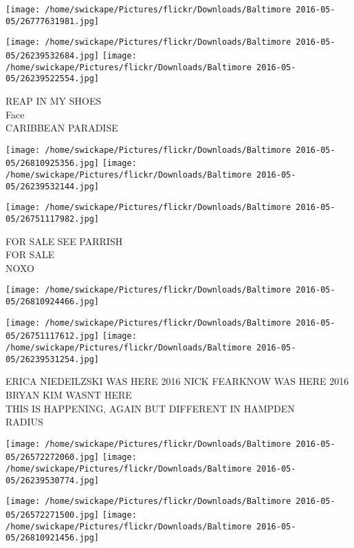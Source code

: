 \documentclass[10pt,letterpaper]{article}
\begin{document}
\texttt{[image: /home/swickape/Pictures/flickr/Downloads/Baltimore 2016-05-05/26777631981.jpg]}

\vspace{0.25in}
\texttt{[image: /home/swickape/Pictures/flickr/Downloads/Baltimore 2016-05-05/26239532684.jpg]}
\texttt{[image: /home/swickape/Pictures/flickr/Downloads/Baltimore 2016-05-05/26239522554.jpg]}

REAP IN MY SHOES\\
Face\\
CARIBBEAN PARADISE\\
\pagebreak

\texttt{[image: /home/swickape/Pictures/flickr/Downloads/Baltimore 2016-05-05/26810925356.jpg]}
\texttt{[image: /home/swickape/Pictures/flickr/Downloads/Baltimore 2016-05-05/26239532144.jpg]}

\texttt{[image: /home/swickape/Pictures/flickr/Downloads/Baltimore 2016-05-05/26751117982.jpg]}

FOR SALE SEE PARRISH\\
FOR SALE\\
NOXO\\
\pagebreak

\texttt{[image: /home/swickape/Pictures/flickr/Downloads/Baltimore 2016-05-05/26810924466.jpg]}

\vspace{0.25in}
\texttt{[image: /home/swickape/Pictures/flickr/Downloads/Baltimore 2016-05-05/26751117612.jpg]}
\texttt{[image: /home/swickape/Pictures/flickr/Downloads/Baltimore 2016-05-05/26239531254.jpg]}

ERICA NIEDEILZSKI WAS HERE 2016 NICK FEARKNOW WAS HERE 2016 BRYAN KIM WASNT HERE\\
THIS IS HAPPENING, AGAIN BUT DIFFERENT IN HAMPDEN\\
RADIUS\\
\pagebreak

\texttt{[image: /home/swickape/Pictures/flickr/Downloads/Baltimore 2016-05-05/26572272060.jpg]}
\texttt{[image: /home/swickape/Pictures/flickr/Downloads/Baltimore 2016-05-05/26239530774.jpg]}

\texttt{[image: /home/swickape/Pictures/flickr/Downloads/Baltimore 2016-05-05/26572271500.jpg]}
\texttt{[image: /home/swickape/Pictures/flickr/Downloads/Baltimore 2016-05-05/26810921456.jpg]}
\end{document}
